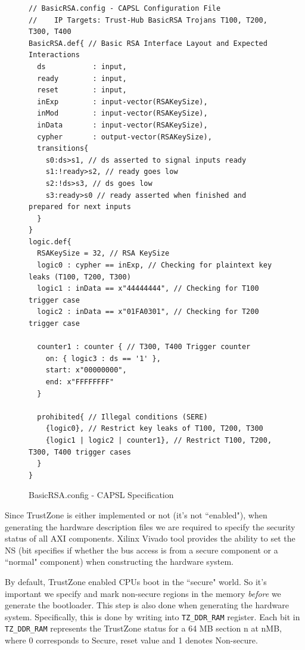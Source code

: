 \documentclass[sigconf]{acmart}
\theoremstyle{plain}
\theoremstyle{remark}
\begin{document}
\begin{figure} [t]
\begin{lstlisting}
// BasicRSA.config - CAPSL Configuration File
//    IP Targets: Trust-Hub BasicRSA Trojans T100, T200, T300, T400
BasicRSA.def{ // Basic RSA Interface Layout and Expected Interactions
  ds           : input,
  ready        : input,
  reset        : input,
  inExp        : input-vector(RSAKeySize),
  inMod        : input-vector(RSAKeySize),
  inData       : input-vector(RSAKeySize),
  cypher       : output-vector(RSAKeySize),
  transitions{
    s0:ds>s1, // ds asserted to signal inputs ready
    s1:!ready>s2, // ready goes low
    s2:!ds>s3, // ds goes low
    s3:ready>s0 // ready asserted when finished and prepared for next inputs
  }
}
logic.def{
  RSAKeySize = 32, // RSA KeySize
  logic0 : cypher == inExp, // Checking for plaintext key leaks (T100, T200, T300)
  logic1 : inData == x"44444444", // Checking for T100 trigger case
  logic2 : inData == x"01FA0301", // Checking for T200 trigger case

  counter1 : counter { // T300, T400 Trigger counter
    on: { logic3 : ds == '1' },
    start: x"00000000",
    end: x"FFFFFFFF"
  }

  prohibited{ // Illegal conditions (SERE)
    {logic0}, // Restrict key leaks of T100, T200, T300
    {logic1 | logic2 | counter1}, // Restrict T100, T200, T300, T400 trigger cases
  }
}
\end{lstlisting}
\vspace*{-0.2cm}
\caption{BasicRSA.config - CAPSL Specification}
\label{fig:BasicRSASpec}
\vspace*{-0.3cm}
\end{figure}

Since TrustZone is either implemented or not (it's not ``enabled"), when generating the  hardware description files we are required to specify the security status of all AXI components. Xilinx Vivado tool provides the ability to set the NS (bit specifies if whether the bus access is from a secure component or a ``normal" component) when constructing the hardware system.

By default, TrustZone enabled CPUs boot in the ``secure" world. So it's important we specify and mark non-secure regions in the memory \textit{before} we generate the bootloader. This step is also done when generating the hardware system. Specifically, this is done by writing into \texttt{TZ\_DDR\_RAM} register. Each bit in \texttt{TZ\_DDR\_RAM} represents the TrustZone status for a 64 MB section n at nMB, where 0 corresponds to Secure, reset value and 1 denotes Non-secure.
\end{document}
